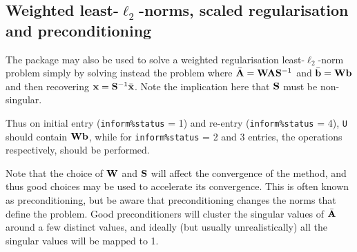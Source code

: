 \documentclass{galahad}
\newcommand{\packagename}{L2\-RT}
\begin{document}

\subsection{Weighted least-$\ell_2$-norms, scaled regularisation and 
preconditioning}
The package may also be used to solve a weighted regularisation 
least-$\ell_2$-norm problem
simply by solving instead the problem
where $\bar{{\mathbf{A}}} = {\mathbf{W}} {\mathbf{A}} {\mathbf{S}}^{-1}$ and 
$\bar{{\mathbf{b}}} = {\mathbf{W}} {\mathbf{b}}$
and then recovering ${\mathbf{x}} = {\mathbf{S}}^{-1} \bar{{\mathbf{x}}}$. Note the implication here
that ${\mathbf{S}}$ must be non-singular.

Thus on initial entry ({\tt inform\%status} = 1) and re-entry
({\tt inform\%status} = 4), {\tt U} should contain ${\mathbf{W}} {\mathbf{b}}$,
while for {\tt inform\%status} = 2 and 3 entries, the operations
respectively, should be performed.

Note that the choice of ${\mathbf{W}}$ and ${\mathbf{S}}$ will affect the convergence of the
method, and thus good choices may be used to accelerate its convergence. This
is often known as preconditioning, but be aware that preconditioning changes
the norms that define the problem. Good preconditioners will cluster 
the singular values of $\bar{{\mathbf{A}}}$ around a few distinct values, and ideally
(but usually unrealistically) all the singular values will be mapped to 1.


\end{document}
